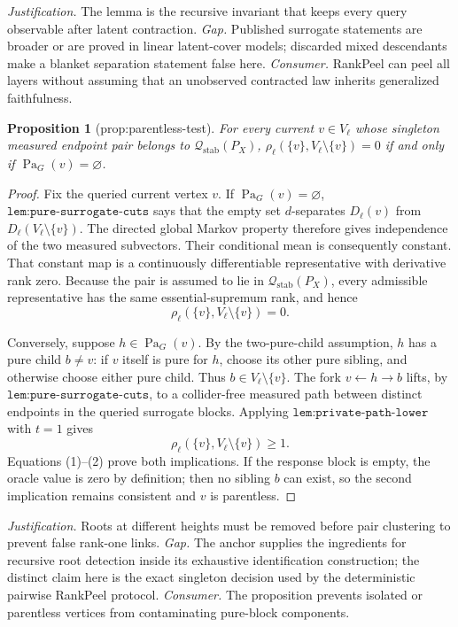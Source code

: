 \documentclass{article}
\newtheorem{proposition}{Proposition}
\begin{document}
\par\smallskip\noindent \textit{Justification.} The lemma is the recursive invariant that keeps every query observable after latent contraction. \textit{Gap.} Published surrogate statements are broader or are proved in linear latent-cover models; discarded mixed descendants make a blanket separation statement false here. \textit{Consumer.} RankPeel can peel all layers without assuming that an unobserved contracted law inherits generalized faithfulness.

\begin{proposition}[prop:parentless-test]\label{prop:parentless-test}
For every current \(v\in V_\ell\) whose singleton measured endpoint pair belongs to \(\mathcal Q_{\mathrm{stab}}(P_X)\), \(\rho_\ell(\{v\},V_\ell\setminus\{v\})=0\) if and only if \(\operatorname{Pa}_G(v)=\varnothing\).
\end{proposition}
\begin{proof}
Fix the queried current vertex \(v\).  If \(\operatorname{Pa}_G(v)=\varnothing\), \(\texttt{lem:pure-surrogate-cuts}\) says that the empty set \(d\)-separates \(D_\ell(v)\) from \(D_\ell(V_\ell\setminus\{v\})\).  The directed global Markov property therefore gives independence of the two measured subvectors.  Their conditional mean is consequently constant.  That constant map is a continuously differentiable representative with derivative rank zero.  Because the pair is assumed to lie in \(\mathcal Q_{\mathrm{stab}}(P_X)\), every admissible representative has the same essential-supremum rank, and hence
\[
 \rho_\ell(\{v\},V_\ell\setminus\{v\})=0. \tag{1}
\]

Conversely, suppose \(h\in\operatorname{Pa}_G(v)\).  By the two-pure-child assumption, \(h\) has a pure child \(b\neq v\): if \(v\) itself is pure for \(h\), choose its other pure sibling, and otherwise choose either pure child.  Thus \(b\in V_\ell\setminus\{v\}\).  The fork \(v\leftarrow h\to b\) lifts, by \(\texttt{lem:pure-surrogate-cuts}\), to a collider-free measured path between distinct endpoints in the queried surrogate blocks.  Applying \(\texttt{lem:private-path-lower}\) with \(t=1\) gives
\[
 \rho_\ell(\{v\},V_\ell\setminus\{v\})\geq1. \tag{2}
\]
Equations (1)--(2) prove both implications.  If the response block is empty, the oracle value is zero by definition; then no sibling \(b\) can exist, so the second implication remains consistent and \(v\) is parentless.
\end{proof}
\par\smallskip\noindent \textit{Justification.} Roots at different heights must be removed before pair clustering to prevent false rank-one links. \textit{Gap.} The anchor supplies the ingredients for recursive root detection inside its exhaustive identification construction; the distinct claim here is the exact singleton decision used by the deterministic pairwise RankPeel protocol. \textit{Consumer.} The proposition prevents isolated or parentless vertices from contaminating pure-block components.
\end{document}
